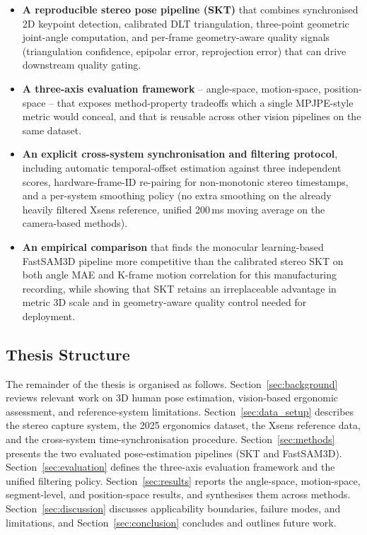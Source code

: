 \documentclass[12pt,a4paper]{article}
\begin{document}
\begin{itemize}[leftmargin=1.2cm]
  \item \textbf{A reproducible stereo pose pipeline (SKT)} that combines
        synchronised 2D keypoint detection, calibrated DLT triangulation,
        three-point geometric joint-angle computation, and per-frame
        geometry-aware quality signals (triangulation confidence, epipolar
        error, reprojection error) that can drive downstream quality gating.
  \item \textbf{A three-axis evaluation framework} -- angle-space, motion-space,
        position-space -- that exposes method-property tradeoffs which a single
        MPJPE-style metric would conceal, and that is reusable across other
        vision pipelines on the same dataset.
  \item \textbf{An explicit cross-system synchronisation and filtering protocol},
        including automatic temporal-offset estimation against three independent
        scores, hardware-frame-ID re-pairing for non-monotonic stereo
        timestamps, and a per-system smoothing policy (no extra smoothing on
        the already heavily filtered Xsens reference, unified 200\,ms moving
        average on the camera-based methods).
  \item \textbf{An empirical comparison} that finds the monocular learning-based
        FastSAM3D pipeline more competitive than the calibrated stereo SKT on
        both angle MAE and K-frame motion correlation for this manufacturing
        recording, while showing that SKT retains an irreplaceable advantage
        in metric 3D scale and in geometry-aware quality control needed for
        deployment.
\end{itemize}

\subsection{Thesis Structure}

The remainder of the thesis is organised as follows.
Section~\ref{sec:background} reviews relevant work on 3D human pose
estimation, vision-based ergonomic assessment, and reference-system
limitations.
Section~\ref{sec:data_setup} describes the stereo capture system, the
2025 ergonomics dataset, the Xsens reference data, and the cross-system
time-synchronisation procedure.
Section~\ref{sec:methods} presents the two evaluated pose-estimation
pipelines (SKT and FastSAM3D).
Section~\ref{sec:evaluation} defines the three-axis evaluation framework and
the unified filtering policy.
Section~\ref{sec:results} reports the angle-space, motion-space,
segment-level, and position-space results, and synthesises them across
methods.
Section~\ref{sec:discussion} discusses applicability boundaries, failure
modes, and limitations, and
Section~\ref{sec:conclusion} concludes and outlines future work.
\end{document}
